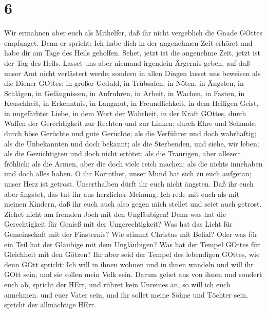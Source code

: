 \hypertarget{section-5}{%
\section{6}\label{section-5}}

 Wir ermahnen aber euch als Mithelfer, daß ihr nicht
vergeblich die Gnade GOttes empfanget.  Denn er spricht: Ich
habe dich in der angenehmen Zeit erhöret und habe dir am Tage des Heils
geholfen. Sehet, jetzt ist die angenehme Zeit, jetzt ist der Tag des
Heils.  Lasset uns aber niemand irgendein Ärgernis geben,
auf daß unser Amt nicht verlästert werde;  sondern in allen
Dingen lasset uns beweisen als die Diener GOttes: in großer Geduld, in
Trübsalen, in Nöten, in Ängsten,  in Schlägen, in
Gefängnissen, in Aufruhren, in Arbeit, in Wachen, in Fasten,
 in Keuschheit, in Erkenntnis, in Langmut, in
Freundlichkeit, in dem Heiligen Geist, in ungefärbter Liebe,
 in dem Wort der Wahrheit, in der Kraft GOttes, durch Waffen
der Gerechtigkeit zur Rechten und zur Linken;  durch Ehre
und Schande, durch böse Gerüchte und gute Gerüchte; als die Verführer
und doch wahrhaftig;  als die Unbekannten und doch bekannt;
als die Sterbenden, und siehe, wir leben; als die Gezüchtigten und doch
nicht ertötet;  als die Traurigen, aber allezeit fröhlich;
als die Armen, aber die doch viele reich machen; als die nichts
innehaben und doch alles haben.  O ihr Korinther, unser
Mund hat sich zu euch aufgetan; unser Herz ist getrost. 
Unserthalben dürft ihr euch nicht ängsten. Daß ihr euch aber ängstet,
das tut ihr aus herzlicher Meinung.  Ich rede mit euch als
mit meinen Kindern, daß ihr euch auch also gegen mich stellet und seiet
auch getrost.  Ziehet nicht am fremden Joch mit den
Ungläubigen! Denn was hat die Gerechtigkeit für Genieß mit der
Ungerechtigkeit? Was hat das Licht für Gemeinschaft mit der Finsternis?
 Wie stimmt Christus mit Belial? Oder was für ein Teil hat
der Gläubige mit dem Ungläubigen?  Was hat der Tempel
GOttes für Gleichheit mit den Götzen? Ihr aber seid der Tempel des
lebendigen GOttes, wie denn GOtt spricht: Ich will in ihnen wohnen und
in ihnen wandeln und will ihr GOtt sein, und sie sollen mein Volk sein.
 Darum gehet aus von ihnen und sondert euch ab, spricht der
HErr, und rühret kein Unreines an, so will ich euch annehmen.
 und euer Vater sein, und ihr sollet meine Söhne und
Töchter sein, spricht der allmächtige HErr.

